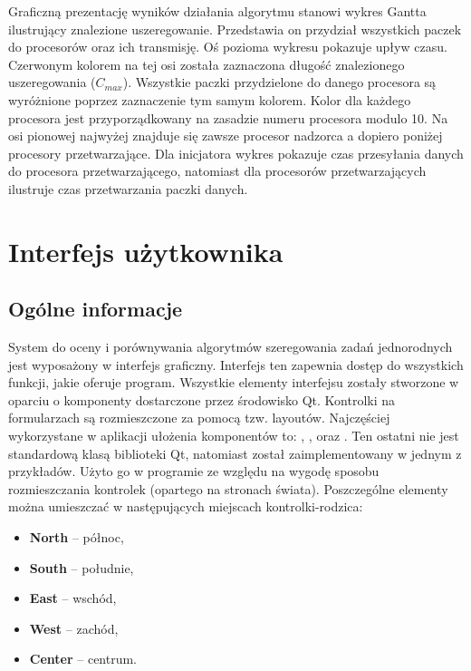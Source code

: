 Graficzną prezentację wyników działania algorytmu stanowi wykres Gantta ilustrujący znalezione uszeregowanie. Przedstawia on przydział wszystkich 
paczek do procesorów oraz ich transmisję. Oś pozioma wykresu pokazuje upływ czasu. Czerwonym kolorem na tej osi została zaznaczona długość 
znalezionego uszeregowania ($C_{max}$). Wszystkie paczki przydzielone do danego procesora są wyróżnione poprzez zaznaczenie tym samym kolorem. 
Kolor dla każdego procesora jest przyporządkowany na zasadzie numeru procesora modulo 10. Na osi pionowej najwyżej znajduje się zawsze procesor 
nadzorca a dopiero poniżej procesory przetwarzające. Dla inicjatora wykres pokazuje czas przesyłania danych do procesora przetwarzającego, 
natomiast dla procesorów przetwarzających ilustruje czas przetwarzania paczki danych.

\section{Interfejs użytkownika}

\subsection{Ogólne informacje}
System do oceny i porównywania algorytmów szeregowania zadań jednorodnych jest wyposażony w interfejs graficzny. Interfejs ten zapewnia 
dostęp do wszystkich funkcji, jakie oferuje program. Wszystkie elementy interfejsu zostały stworzone w oparciu o komponenty dostarczone przez 
środowisko Qt. Kontrolki na formularzach są rozmieszczone za pomocą tzw. layoutów. Najczęściej wykorzystane w aplikacji ułożenia komponentów to: 
, ,  oraz . Ten ostatni nie jest standardową klasą biblioteki Qt, 
natomiast został zaimplementowany 
w jednym z przykładów. Użyto go w programie ze względu na wygodę sposobu rozmieszczania kontrolek (opartego na stronach świata). Poszczególne elementy 
można umieszczać w następujących miejscach kontrolki-rodzica:
\begin{itemize}
	\item \textbf{North} -- północ,
	\item \textbf{South} -- południe,
	\item \textbf{East} -- wschód,
	\item \textbf{West} -- zachód,
	\item \textbf{Center} -- centrum.
\end{itemize}

